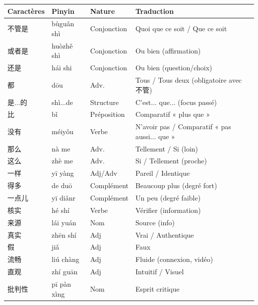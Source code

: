 \documentclass[11pt]{article}
\begin{document}
\begin{center}
\begin{tabularx}{\linewidth}{|X|X|X|X|}
\hline
\rowcolor{popblueL} \textbf{Caractères} & \textbf{Pinyin} & \textbf{Nature} & \textbf{Traduction} \\
\hline
不管是 & bùguǎn shì & Conjonction & Quoi que ce soit / Que ce soit \\
\hline
或者是 & huòzhě shì & Conjonction & Ou bien (affirmation) \\
\hline
还是 & hái shi & Conjonction & Ou bien (question/choix) \\
\hline
都 & dōu & Adv. & Tous / Tous deux (obligatoire avec 不管) \\
\hline
是...的 & shì...de & Structure & C'est... que... (focus passé) \\
\hline
比 & bǐ & Préposition & Comparatif « plus que » \\
\hline
没有 & méiyǒu & Verbe & N'avoir pas / Comparatif « pas aussi... que » \\
\hline
那么 & nà me & Adv. & Tellement / Si (loin) \\
\hline
这么 & zhè me & Adv. & Si / Tellement (proche) \\
\hline
一样 & yī yàng & Adj/Adv & Pareil / Identique \\
\hline
得多 & de duō & Complément & Beaucoup plus (degré fort) \\
\hline
一点儿 & yī diǎnr & Complément & Un peu (degré faible) \\
\hline
核实 & hé shí & Verbe & Vérifier (information) \\
\hline
来源 & lái yuán & Nom & Source (info) \\
\hline
真实 & zhēn shí & Adj & Vrai / Authentique \\
\hline
假 & jiǎ & Adj & Faux \\
\hline
流畅 & liú chàng & Adj & Fluide (connexion, vidéo) \\
\hline
直观 & zhí guān & Adj & Intuitif / Visuel \\
\hline
批判性 & pī pàn xìng & Nom & Esprit critique \\
\hline
\end{tabularx}
\end{center}
\end{document}
